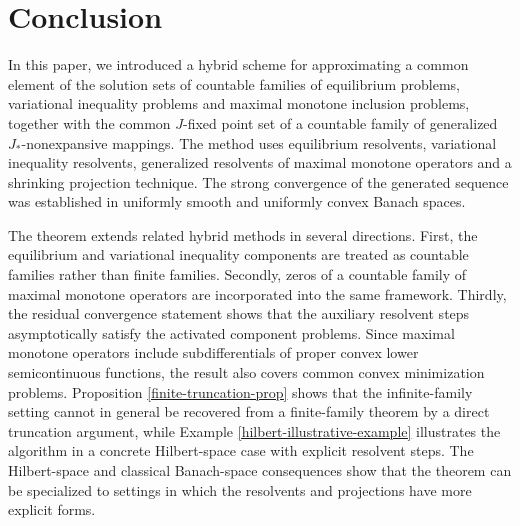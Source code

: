 \documentclass[leqno,12pt]{amsart}
\theoremstyle{definition}
\numberwithin{equation}{section}
\begin{document}
\section{Conclusion}

In this paper, we introduced a hybrid scheme for approximating a common element of the solution sets of countable families of equilibrium problems, variational inequality problems and maximal monotone inclusion problems, together with the common $J$-fixed point set of a countable family of generalized $J_{*}$-nonexpansive mappings. The method uses equilibrium resolvents, variational inequality resolvents, generalized resolvents of maximal monotone operators and a shrinking projection technique. The strong convergence of the generated sequence was established in uniformly smooth and uniformly convex Banach spaces.

The theorem extends related hybrid methods in several directions. First, the equilibrium and variational inequality components are treated as countable families rather than finite families. Secondly, zeros of a countable family of maximal monotone operators are incorporated into the same framework. Thirdly, the residual convergence statement shows that the auxiliary resolvent steps asymptotically satisfy the activated component problems. Since maximal monotone operators include subdifferentials of proper convex lower semicontinuous functions, the result also covers common convex minimization problems. Proposition \ref{finite-truncation-prop} shows that the infinite-family setting cannot in general be recovered from a finite-family theorem by a direct truncation argument, while Example \ref{hilbert-illustrative-example} illustrates the algorithm in a concrete Hilbert-space case with explicit resolvent steps. The Hilbert-space and classical Banach-space consequences show that the theorem can be specialized to settings in which the resolvents and projections have more explicit forms.
\end{document}
